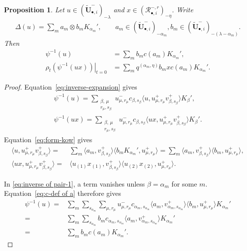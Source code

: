 \documentclass[a4paper,reqno,12pt]{amsart}
\numberwithin{equation}{section}
\newtheorem{proposition}{Proposition}[section]
\theoremstyle{definition}
\theoremstyle{plain}
\theoremstyle{definition}
\def\tU{\widetilde{\mathbf U}}
\def \tbiU{\tU_{\bullet,i}}
\def\cR{\mathcal R}
\begin{document}
\begin{proposition}\label{lem:mixed-lift}
Let $u\in(\tbiU^-)_{-\lambda}$ and
$x\in(\cR_{\bullet,i}^{-,r})_{-\eta}$. Write
\begin{align}
\Delta(u)=\sum_m a_m\otimes b_mK_{\alpha_m}',\qquad a_m\in(\tbiU^-)_{-\alpha_m},
b_m\in(\tbiU^-)_{-(\lambda-\alpha_m)}.\label{eq:coproduct}
\end{align}
Then
\begin{align}
\psi^{-1}(u)
&=\sum_m b_m c(a_m)K_{\alpha_m}',\label{eq:local-lift}\\
\left.\rho_t(\psi^{-1}(ux))\right|_{t=0}
&=\sum_m q^{(\alpha_m,\eta)}
b_mx c(a_m)K_{\alpha_m}'.\label{eq:mixed-lift}
\end{align}
\end{proposition}

\begin{proof}
Equation~\eqref{eq:inverse-expansion} gives
\begin{align}
\psi^{-1}(u)=\sum_{\substack{\beta,\,\mu\\r_\mu,s_\beta}}
u^-_{\mu,r_\mu}c_{\beta,s_\beta}
\langle u,u^+_{\mu,r_\mu}v^+_{\beta,s_\beta}\rangle K_\beta',\label{eq:inverse-1}\\
\psi^{-1}(ux)=\sum_{\substack{\beta,\,\mu\\r_\mu,s_\beta}}
u^-_{\mu,r_\mu}c_{\beta,s_\beta}
\langle ux,u^+_{\mu,r_\mu}v^+_{\beta,s_\beta}\rangle K_\beta'.\label{eq:inverse-2}
\end{align}
Equation~\eqref{eq:form-kow} gives 
\begin{align}
 \langle u,u^+_{\mu,r_\mu}v^+_{\beta,s_\beta}\rangle=& \sum_m \langle a_m,v^+_{\beta,s_\beta}\rangle\langle b_mK_{\alpha_m}',u^+_{\mu,r_\mu}\rangle= \sum_m \langle a_m,v^+_{\beta,s_\beta}\rangle\langle b_m,u^+_{\mu,r_\mu}\rangle,\label{eq:inverse of pair-1}\\
 \langle ux,u^+_{\mu,r_\mu}v^+_{\beta,s_\beta}\rangle=&\langle u_{(1)}x_{(1)},v^+_{\beta,s_\beta}\rangle\langle u_{(2)}x_{(2)},u^+_{\mu,r_\mu}\rangle\label{eq:inverse of pair-2}.
\end{align}

In \eqref{eq:inverse of pair-1}, a term vanishes unless $\beta=\alpha_m$ for some $m$. Equation~\eqref{eq:c-def of a} therefore gives
\begin{align*}
 \psi^{-1}(u)=&\sum_{m}\sum_{s_{\alpha_m}}\sum_{\mu,r_\mu}
u^-_{\mu,r_\mu}c_{\alpha_m,s_{\alpha_m}}\langle a_m,v^+_{\alpha_m,s_{\alpha_m}}\rangle\langle b_m,u^+_{\mu,r_\mu}\rangle K_{\alpha_m}' \\
=&\sum_{m}\sum_{s_{\alpha_m}}b_mc_{\alpha_m,s_{\alpha_m}}\langle a_m,v^+_{\alpha_m,s_{\alpha_m}}\rangle K_{\alpha_m}'\\
=&\sum_m b_m c(a_m)K_{\alpha_m}'.
\end{align*}


\end{proof}
\end{document}
